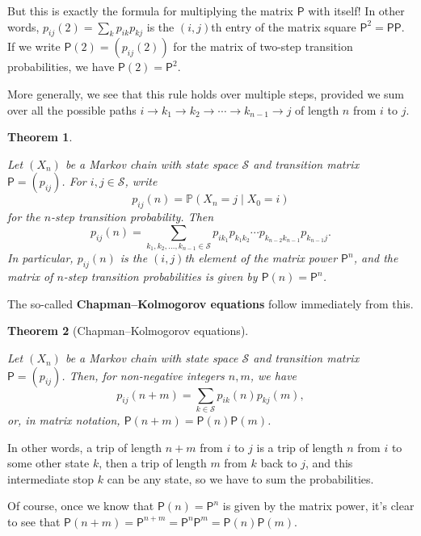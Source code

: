 \documentclass[
  a4paper,
]{article}
\newtheorem{theorem}{Theorem}[section]
\theoremstyle{definition}
\theoremstyle{definition}
\theoremstyle{definition}
\theoremstyle{remark}
\begin{document}
But this is exactly the formula for multiplying the matrix \(\mathsf P\) with itself! In other words, \(p_{ij}(2) = \sum_{k} p_{ik}p_{kj}\) is the \((i,j)\)th entry of the matrix square \(\mathsf P^2 = \mathsf{PP}\). If we write \(\mathsf P(2) = (p_{ij}(2))\) for the matrix of two-step transition probabilities, we have \(\mathsf P(2) = \mathsf P^2\).

More generally, we see that this rule holds over multiple steps, provided we sum over all the possible paths \(i\to k_1 \to k_2 \to \cdots \to k_{n-1} \to j\) of length \(n\) from \(i\) to \(j\).

\begin{theorem}
\protect\hypertarget{thm:thm-n-step}{}\label{thm:thm-n-step}

Let \((X_n)\) be a Markov chain with state space \(\mathcal S\) and transition matrix \(\mathsf P = (p_{ij})\). For \(i,j \in \mathcal S\), write
\[ p_{ij}(n) = \mathbb P(X_n = j \mid X_0 = i) \]
for the \(n\)-step transition probability. Then
\[ p_{ij}(n) = \sum_{k_1, k_2, \dots, k_{n-1} \in \mathcal S} p_{ik_1} p_{k_1k_2} \cdots p_{k_{n-2}k_{n-1}} p_{k_{n-1}j} . \]
In particular, \(p_{ij}(n)\) is the \((i,j)\)th element of the matrix power \(\mathsf P^n\), and the matrix of \(n\)-step transition probabilities is given by \(\mathsf P(n) = \mathsf P^n\).

\end{theorem}

The so-called \textbf{Chapman--Kolmogorov equations} follow immediately from this.

\begin{theorem}[Chapman–Kolmogorov equations]
\protect\hypertarget{thm:c-k}{}\label{thm:c-k}

Let \((X_n)\) be a Markov chain with state space \(\mathcal S\) and transition matrix \(\mathsf P = (p_{ij})\). Then, for non-negative integers \(n,m\), we have
\[ p_{ij}(n+m) = \sum_{k \in \mathcal S} p_{ik}(n)p_{kj}(m) , \]
or, in matrix notation, \(\mathsf P(n+m) = \mathsf P(n)\mathsf P(m)\).

\end{theorem}

In other words, a trip of length \(n + m\) from \(i\) to \(j\) is a trip of length \(n\) from \(i\) to some other state \(k\), then a trip of length \(m\) from \(k\) back to \(j\), and this intermediate stop \(k\) can be any state, so we have to sum the probabilities.

Of course, once we know that \(\mathsf P(n) = \mathsf P^n\) is given by the matrix power, it's clear to see that \(\mathsf P(n+m) = \mathsf P^{n+m} = \mathsf P^n \mathsf P^m = \mathsf P(n)\mathsf P(m)\).
\end{document}
